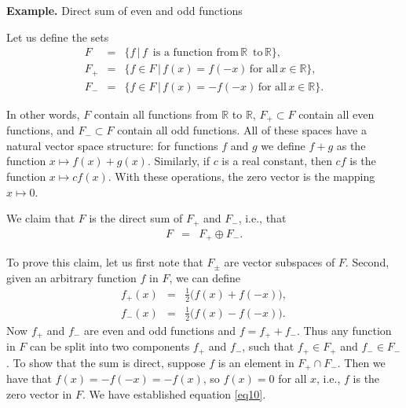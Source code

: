 \documentclass[12pt]{article}
\begin{document}
\newcommand{\sR}[0]{\mathbb{R}}

{\bf Example.} Direct sum of even and odd functions 

Let us define the sets
\begin{eqnarray*}
F &=& \{ f\, |\, f\,\mbox{ is a function from}\, \sR\, \mbox{ to}\, \sR \}, \\
F_+ &=& \{ f\in F \,|\, f(x)=f(-x) \,\mbox{for all}\, x\in \sR\}, \\
F_- &=& \{ f\in F \,|\, f(x)=-f(-x)\,\mbox{for all}\, x\in \sR\}.
\end{eqnarray*}

In other words, $F$ contain all functions from $\sR$ to $\sR$, $F_+\subset F$
contain all even functions, and $F_-\subset F$ contain all odd functions.
All of these spaces  have a natural vector space structure:
for functions  $f$ and $g$ we define
$f+g$ as the function $x\mapsto f(x)+g(x)$. Similarly, if $c$ is
a real constant, then $cf$ is the
function $x\mapsto cf(x)$.  With these operations, the zero vector
is the mapping $x\mapsto 0$.

We claim that $F$ is the direct sum of $F_+$ and $F_-$, i.e.,
that
\begin{eqnarray}
\label{eq10}
F &=& F_+ \oplus F_-.
\end{eqnarray}

To prove this claim, let us first note that  $F_\pm$ are vector subspaces of $F$.
Second, given an arbitrary function $f$ in $F$, we can define
\begin{eqnarray*}
f_+(x) &=& \frac{1}{2}\big( f(x) + f(-x) \big), \\
f_-(x) &=& \frac{1}{2}\big( f(x) - f(-x) \big).
\end{eqnarray*}
Now $f_+$ and $f_-$ are even and odd functions and $f=f_+ + f_-$.
Thus any function in $F$ can be split into two components $f_+$ and $f_-$,
such that $f_+ \in F_+$ and $f_-\in F_-$.
To show that the sum is direct, suppose $f$ is an element in $F_+\cap F_-$.
Then we have that $f(x)=-f(-x)=-f(x)$, so $f(x)=0$ for all $x$, i.e., $f$ is
the zero vector in $F$. We have established equation \ref{eq10}.
\end{document}

